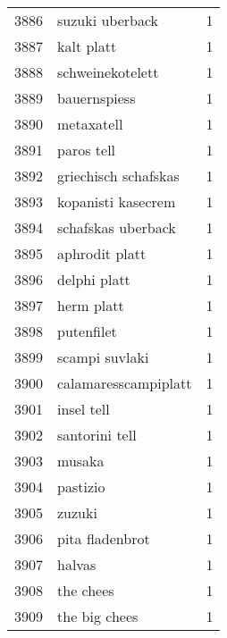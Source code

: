 \begin{tabular}{llr}
3886 &                                    suzuki uberback &      1 \\
3887 &                                         kalt platt &      1 \\
3888 &                                   schweinekotelett &      1 \\
3889 &                                       bauernspiess &      1 \\
3890 &                                         metaxatell &      1 \\
3891 &                                         paros tell &      1 \\
3892 &                               griechisch schafskas &      1 \\
3893 &                                 kopanisti kasecrem &      1 \\
3894 &                                 schafskas uberback &      1 \\
3895 &                                     aphrodit platt &      1 \\
3896 &                                       delphi platt &      1 \\
3897 &                                         herm platt &      1 \\
3898 &                                         putenfilet &      1 \\
3899 &                                     scampi suvlaki &      1 \\
3900 &                               calamaresscampiplatt &      1 \\
3901 &                                         insel tell &      1 \\
3902 &                                     santorini tell &      1 \\
3903 &                                             musaka &      1 \\
3904 &                                           pastizio &      1 \\
3905 &                                             zuzuki &      1 \\
3906 &                                    pita fladenbrot &      1 \\
3907 &                                             halvas &      1 \\
3908 &                                          the chees &      1 \\
3909 &                                      the big chees &      1 \\

\end{tabular}

